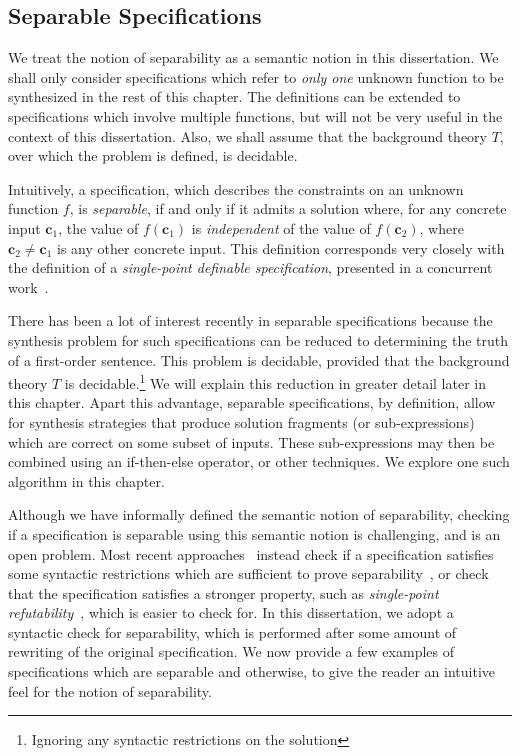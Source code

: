 \subsection{Separable Specifications}
\label{subsection:separable_specs}
We treat the notion of separability as a semantic notion in this
dissertation. We shall only consider \sygusbody specifications
which refer to \emph{only one} unknown function to be synthesized in
the rest of this chapter. The definitions can be extended to
specifications which involve multiple functions, but will not be very
useful in the context of this dissertation. Also, we shall assume that
the background theory $T$, over which the \sygusbody problem is
defined, is decidable.

Intuitively, a specification, which
describes the constraints on an unknown function $f$, is
\emph{separable}, if and only if it admits a solution where, for any
concrete input $\mathbf{c}_1$, the value of $f(\mathbf{c}_1)$ is
\emph{independent} of the value of $f(\mathbf{c}_2)$, where
$\mathbf{c}_2 \neq \mathbf{c}_1$ is any other concrete input. This
definition corresponds very closely with the definition of
a \emph{single-point definable specification}, presented in a
concurrent work~\cite{madhusudan-16}.

There has been a lot of interest recently in separable
specifications because the synthesis problem for such specifications
can be reduced to determining the truth of a first-order sentence.
This problem is decidable, provided that the background theory $T$ is
decidable.\footnote{Ignoring any syntactic restrictions on the
  solution} We will explain this reduction in greater detail later in
this chapter. Apart this advantage, separable specifications, by
definition, allow for synthesis strategies that produce solution
fragments (or sub-expressions) which are correct on some subset of
inputs. These sub-expressions may then be combined using an
if-then-else operator, or other techniques. We explore one such
algorithm in this chapter.

Although we have informally defined the semantic notion of
separability, checking if a \sygusbody specification is separable
using this semantic notion is challenging, and is an open problem.
Most recent approaches~\cite{radhakrishna-15, reynolds-15,
madhusudan-16} instead check if a specification satisfies some
syntactic restrictions which are sufficient to prove
separability~\cite{radhakrishna-15, reynolds-15}, or check that the
specification satisfies a stronger property, such as
\emph{single-point refutability}~\cite{madhusudan-16}, which is easier
to check for. In this dissertation, we adopt a syntactic check for
separability, which is performed after some amount of rewriting of the
original specification. We now provide a few examples of \sygusbody
specifications which are separable and otherwise, to give the reader
an intuitive feel for the notion of separability.

